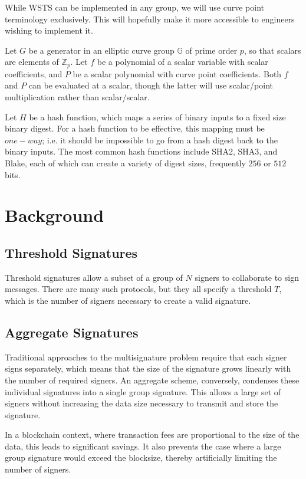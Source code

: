 \documentclass{article}
\theoremstyle{plain}
\theoremstyle{definition}
\theoremstyle{remark}
\begin{document}
While WSTS can be implemented in any group, we will use curve point terminology exclusively.  This will hopefully make it more accessible to engineers wishing to implement it.

Let $G$ be a generator in an elliptic curve group $\mathbb{G}$ of prime order $p$, so that scalars are elements of $\mathbb{Z}_p$.  Let $f$ be a polynomial of a scalar variable with scalar coefficients, and $P$ be a scalar polynomial with curve point coefficients.  Both $f$ and $P$ can be evaluated at a scalar, though the latter will use scalar/point multiplication rather than scalar/scalar.

Let $H$ be a hash function, which maps a series of binary inputs to a fixed size binary digest.  For a hash function to be effective, this mapping must be $one-way$; i.e. it should be impossible to go from a hash digest back to the binary inputs.  The most common hash functions include SHA2, SHA3, and Blake, each of which can create a variety of digest sizes, frequently $256$ or $512$ bits.

\newpage
\onecolumn
\section{
  Background
}

\subsection{
  Threshold Signatures
}

Threshold signatures allow a subset of a group of $N$ signers to collaborate to sign messages.  There are many such protocols, but they all specify a threshold $T$, which is the number of signers necessary to create a valid signature.  

\subsection{
  Aggregate Signatures
}

Traditional approaches to the multisignature problem require that each signer signs separately, which means that the size of the signature grows linearly with the number of required signers.  An aggregate scheme, conversely, condenses these individual signatures into a single group signature.  This allows a large set of signers without increasing the data size necessary to transmit and store the signature.

In a blockchain context, where transaction fees are proportional to the size of the data, this leads to significant savings.  It also prevents the case where a large group signature would exceed the blocksize, thereby artificially limiting the number of signers.
\end{document}
